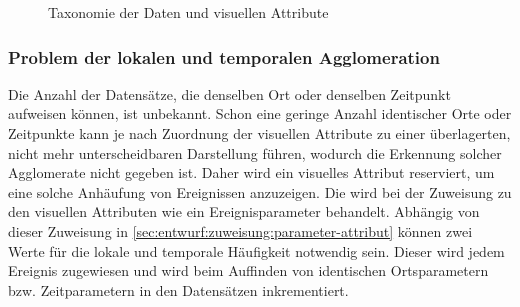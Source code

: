 \begin{figure}
	{\caption{Taxonomie der Daten und visuellen Attribute}\label{fig:entwurf:taxonomie}}
\end{figure}

\subsubsection{Problem der lokalen und temporalen Agglomeration}\label{sec:entwurf:agglomeration}

Die Anzahl der Datensätze, die denselben Ort oder denselben Zeitpunkt aufweisen können, ist unbekannt. Schon eine geringe Anzahl identischer Orte oder Zeitpunkte kann je nach Zuordnung der visuellen Attribute zu einer überlagerten, nicht mehr unterscheidbaren Darstellung führen, wodurch die Erkennung solcher Agglomerate nicht gegeben ist. Daher wird ein visuelles Attribut reserviert, um eine solche Anhäufung von Ereignissen anzuzeigen. Die  wird bei der Zuweisung zu den visuellen Attributen wie ein Ereignisparameter behandelt. Abhängig von dieser Zuweisung in \autoref{sec:entwurf:zuweisung:parameter-attribut} können zwei Werte für die lokale und temporale Häufigkeit notwendig sein. Dieser wird jedem Ereignis zugewiesen und wird beim Auffinden von identischen Ortsparametern bzw. Zeitparametern in den Datensätzen inkrementiert.

